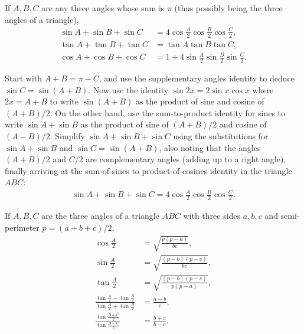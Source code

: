 \documentclass[12pt,a4paper]{memoir}
\theoremstyle{definition}
\begin{document}
\begin{question}\label{q:sinA+sinB+sinC}
	If $A, B, C$ are any three angles whose sum is $\pi$ (thus possibly being the three angles of a triangle),
	\begin{align}
		\sin A + \sin B + \sin C &= 4 \cos \frac{A}{2} \cos \frac{B}{2} \cos \frac{C}{2},\\
		\tan A + \tan B + \tan C &= \tan A \tan B \tan C,\\
		\cos A + \cos B + \cos C &= 1 + 4 \sin \frac{A}{2} \sin \frac{B}{2} \sin \frac{C}{2}.
	\end{align}
\end{question}

\begin{solution}
	Start with $A + B = \pi - C$, and use the supplementary angles identity to deduce $\sin C = \sin(A+B)$. Now use the identity $\sin 2x = 2\sin x \cos x$ where $2x=A+B$ to write $\sin(A+B)$ as the product of sine and cosine of $(A+B)/2$. On the other hand, use the sum-to-product identity for sines to write $\sin A + \sin B$ as the product of sine of $(A+B)/2$ and cosine of $(A-B)/2$. Simplify $\sin A + \sin B + \sin C$ using the substitutions for $\sin A + \sin B$ and $\sin C = \sin (A+B)$, also noting that the angles $(A+B)/2$ and $C/2$ are complementary angles (adding up to a right angle), finally arriving at the sum-of-sines to product-of-cosines identity in the triangle $ABC$:
	\begin{align*}
		\sin A + \sin B + \sin C = 4 \cos \frac{A}{2} \cos \frac{B}{2} \cos \frac{C}{2}.
	\end{align*}
\end{solution}

\begin{question}
	If $A, B, C$ are the three angles of a triangle $ABC$ with three sides $a,b,c$ and semi-perimeter $p=(a+b+c)/2$,
	\begin{align}
		\cos \frac{A}{2} &= \sqrt{\frac{p(p-a)}{bc}},\\
		\sin \frac{A}{2} &= \sqrt{\frac{(p-b)(p-c)}{bc}},\\
		\tan \frac{A}{2} &= \sqrt{\frac{(p-b)(p-c)}{p(p-a)}},\\
		\frac{\tan \frac{A}{2}-\tan \frac{B}{2}}{\tan \frac{A}{2}+\tan \frac{B}{2}} &= \frac{a-b}{c},\\
		\frac{\tan \frac{B+C}{2}}{\tan \frac{B-C}{2}} &= \frac{b+c}{b-c}.
	\end{align}
\end{question}
\end{document}
